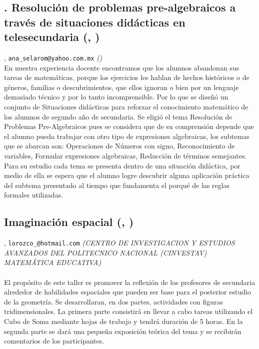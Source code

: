 \subsection{.	Resolución de problemas pre-algebraicos a través de situaciones didácticas en telesecundaria {\footnotesize (, )}} \label{reg-1886} 
, {\tt ana_selarom@yahoo.com.mx}  {\slshape ()}\\
          \noindent En nuestra experiencia docente encontramos que los alumnos abandonan sus tareas de matemáticas, porque los ejercicios les hablan de hechos históricos o de géneros, familias o descubrimientos, que ellos ignoran o bien por un lenguaje demasiado técnico y por lo tanto incomprensible. Por lo que se diseñó un conjunto de Situaciones didácticas para reforzar el conocimiento matemático de los alumnos de segundo año de secundaria. Se eligió el tema Resolución de Problemas Pre-Algebraicos pues se considera que de su comprensión depende que el alumno pueda trabajar con otro tipo de expresiones algebraicas, los subtemas que se abarcan son: Operaciones de Números con signo, Reconocimiento de variables, Formular expresiones algebraicas, Reducción de términos semejantes. Para su estudio cada tema se presenta dentro de una situación didáctica, por medio de ella se espera que el alumno logre descubrir alguna aplicación práctica del subtema presentado al tiempo que fundamenta el porqué de las reglas formales utilizadas.
\subsection{\sffamily Imaginación espacial {\footnotesize (, )}} \label{reg-1368} 
, {\tt lorozco_@hotmail.com}  {\slshape (CENTRO DE INVESTIGACION Y ESTUDIOS AVANZADOS DEL POLITECNICO NACIONAL (CINVESTAV) MATEMÁTICA EDUCATIVA)}\\
\\
\noindent El propósito de este taller es promover la reflexión de los profesores de secundaria alrededor de habilidades espaciales que pueden ser base para el posterior estudio de la geometría. Se desarrollaran, en dos partes, actividades con figuras tridimensionales. La primera parte consistirá en llevar a cabo tareas utilizando el Cubo de Soma mediante hojas de trabajo y tendrá duración de 5 horas. En la segunda parte se dará una pequeña exposición teórica del tema y se recibirán comentarios de los participantes.

